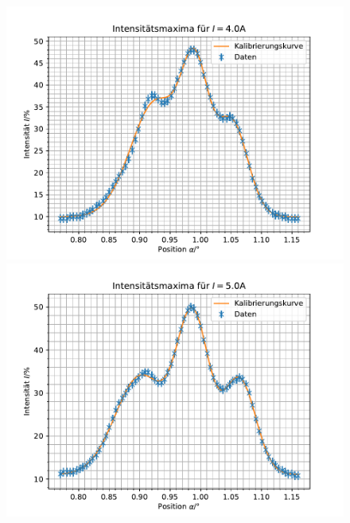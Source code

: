 \documentclass{article}
\begin{document}
\begin{figure}[h]
  \begin{minipage}{.49\linewidth}
    \centering
    \includegraphics[width=\linewidth]{gauss_4.0A.pdf}
  \end{minipage}
  \hfill
  \begin{minipage}{.49\linewidth}
    \centering
    \includegraphics[width=\linewidth]{gauss_5.0A.pdf}
  \end{minipage}


\end{figure}
\end{document}
